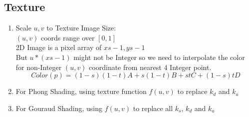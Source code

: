 \documentclass[geye,cyan,normal,en]{elegantnote}
\begin{document}
\subsection{Texture}
\begin{enumerate}
	\item Scale $u,v$ to Texture Image Size:\\
	$(u,v)$ coords range over $[0,1]$\\
	2D Image is a pixel array of $xs-1,ys-1$\\
	But $u*(xs-1)$ might not be Integer so we need to interpolate the color for non-Integer $(u,v)$ coordinate from nearest 4 Integer point.
	$$Color(p)=(1-s)(1-t)A+s(1-t)B+stC+(1-s)tD$$
	\item For Phong Shading, using texture function $f(u,v)$ to replace $k_d$ and $k_a$
	\item For Gouraud Shading, using $f(u,v)$ to replace all $k_s$, $k_d$ and $k_a$
\end{enumerate}
\end{document}
